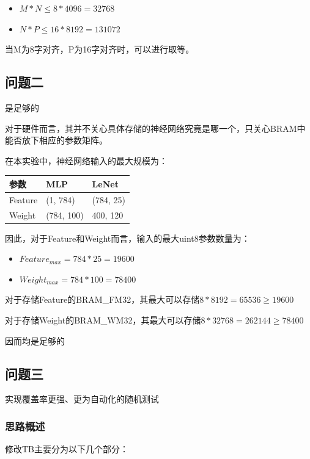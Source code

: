 \documentclass[12pt,a4paper]{article}
\begin{document}
\begin{itemize}
\item
  \(M * N \le 8 * 4096 = 32768\)
\item
  \(N * P \le 16 * 8192 = 131072\)
\end{itemize}

当M为8字对齐，P为16字对齐时，可以进行取等。

\subsection{问题二}

是足够的

对于硬件而言，其并不关心具体存储的神经网络究竟是哪一个，只关心BRAM中能否放下相应的参数矩阵。

在本实验中，神经网络输入的最大规模为：

\begin{longtable}[]{@{}lll@{}}
\toprule\noalign{}
参数 & MLP & LeNet \\
\midrule\noalign{}
\endhead
\bottomrule\noalign{}
\endlastfoot
Feature & (1, 784) & (784, 25) \\
Weight & (784, 100) & 400, 120 \\
\end{longtable}

因此，对于Feature和Weight而言，输入的最大uint8参数数量为：

\begin{itemize}
\item
  \(Feature_{max} = 784 * 25 = 19600\)
\item
  \(Weight_{max} = 784 * 100 = 78400\)
\end{itemize}

对于存储Feature的BRAM\_FM32，其最大可以存储\(8 * 8192 = 65536 \ge 19600\)

对于存储Weight的BRAM\_WM32，其最大可以存储\(8 * 32768 = 262144 \ge 78400\)

因而均是足够的

\subsection{问题三}

实现覆盖率更强、更为自动化的随机测试

\subsubsection{思路概述}

修改TB主要分为以下几个部分：
\end{document}
